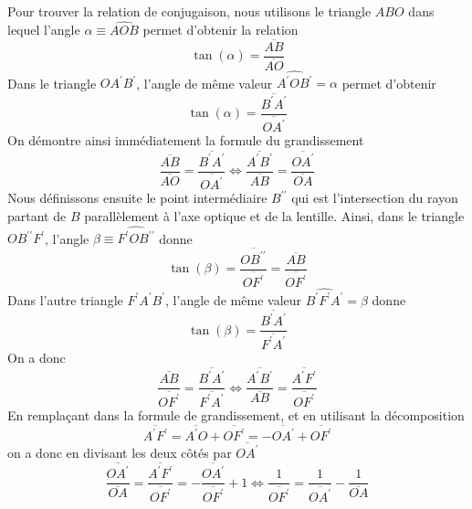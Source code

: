 \documentclass[10pt,a5paper,notitlepage]{book}
\begin{document}
Pour trouver la relation de conjugaison, nous utilisons le triangle $ABO$ dans lequel l'angle $\alpha \equiv \widehat{AOB}$ permet d'obtenir la relation
\begin{equation*}
	\tan(\alpha) = \dfrac{\overline{AB}}{\overline{AO}}
\end{equation*}
Dans le triangle $OA^\prime B^\prime$, l'angle de même valeur $\widehat{A^\prime O B^\prime} = \alpha$ permet d'obtenir
\begin{equation*}
	\tan(\alpha) = \dfrac{\overline{B^\prime A^\prime}}{\overline{OA^\prime}}
\end{equation*}
On démontre ainsi immédiatement la formule du grandissement
\begin{equation*}
	\dfrac{\overline{AB}}{\overline{AO}} = \dfrac{\overline{B^\prime A^\prime}}{\overline{OA^\prime}} \iff \boxed{\dfrac{\overline{A^\prime B^\prime}}{\overline{AB}} = \dfrac{\overline{OA^\prime}}{\overline{OA}}}
\end{equation*}
Nous définissons ensuite le point intermédiaire $B^{\prime\prime}$ qui est l'intersection du rayon partant de $B$ parallèlement à l'axe optique et de la lentille. Ainsi, dans le triangle $OB^{\prime\prime}F^\prime$, l'angle $\beta\equiv \widehat{F^\prime O B^{\prime\prime}}$ donne
\begin{equation*}
	\tan(\beta) = \dfrac{\overline{OB^{\prime\prime}}}{\overline{OF^\prime}} = \dfrac{\overline{AB}}{\overline{OF^\prime}}
\end{equation*}
Dans l'autre triangle $F^\prime A^\prime B^\prime$, l'angle de même valeur $\widehat{B^\prime F^\prime A^\prime} = \beta$ donne
\begin{equation*}
	\tan(\beta) = \dfrac{\overline{B^\prime A^\prime}}{\overline{F^\prime A^\prime}}
\end{equation*}
On a donc
\begin{equation*}
	\dfrac{\overline{AB}}{\overline{OF^\prime}} = \dfrac{\overline{B^\prime A^\prime}}{\overline{F^\prime A^\prime}} \iff \dfrac{\overline{A^\prime B^\prime}}{\overline{AB}} = \dfrac{\overline{A^\prime F^\prime}}{\overline{OF^\prime}}
\end{equation*}
En remplaçant dans la formule de grandissement, et en utilisant la décomposition
\begin{equation*}
	\overline{A^\prime F^\prime} = \overline{A^\prime O} + \overline{OF^\prime} = -\overline{OA^\prime} + \overline{OF^\prime}
\end{equation*}
on a donc en divisant les deux côtés par $\overline{OA^\prime}$
\begin{equation*}
	\dfrac{\overline{OA^\prime}}{\overline{OA}} = \dfrac{\overline{A^\prime F^\prime}}{\overline{OF^\prime}} = - \dfrac{\overline{OA^\prime}}{\overline{OF^\prime}} + 1 \iff \boxed{\dfrac{1}{\overline{OF^\prime}} = \dfrac{1}{\overline{OA^\prime}} - \dfrac{1}{\overline{OA}}}
\end{equation*}
\end{document}
